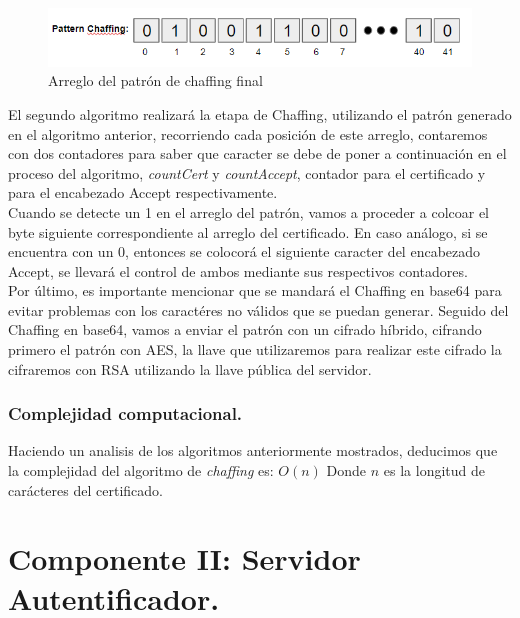 \documentclass[12pt, a4paper, titlepage]{report}
\begin{document}
        		\begin{figure}[H]
        			\begin{center}	                  \includegraphics[width=13cm]{./imagenes/Disenio/Componente_1/algorithm1_3.png}
    				\caption{Arreglo del patrón de chaffing final}
        			\end{center}
        		\end{figure}
    		    
    		    El segundo algoritmo realizará la etapa de Chaffing, utilizando el patrón generado en el algoritmo anterior, recorriendo cada posición de este arreglo, contaremos con dos contadores para saber que caracter se debe de poner a continuación en el proceso del algoritmo, \textit{countCert} y \textit{countAccept}, contador para el certificado y para el encabezado Accept respectivamente. \\
    		    
    		    Cuando se detecte un 1 en el arreglo del patrón, vamos a proceder a colcoar el byte siguiente correspondiente al arreglo del certificado. En caso análogo, si se encuentra con un 0, entonces se colocorá el siguiente caracter del encabezado Accept, se llevará el control de ambos mediante sus respectivos contadores.\\
    		    
    		    Por último, es importante mencionar que se mandará el Chaffing en base64 para evitar problemas con los caractéres no válidos que se puedan generar. Seguido del Chaffing en base64, vamos a enviar el patrón con un cifrado híbrido, cifrando primero el patrón con AES, la llave que utilizaremos para realizar este cifrado la cifraremos con RSA utilizando la llave pública del servidor. 

                \subsubsection{Complejidad computacional.}
                    Haciendo un analisis de los algoritmos anteriormente mostrados, deducimos que la complejidad del algoritmo de \textit{chaffing} es:
                    $O(n)$
                    Donde $n$ es la longitud de carácteres del certificado.

        \section{Componente II: Servidor Autentificador.}
			
\end{document}
